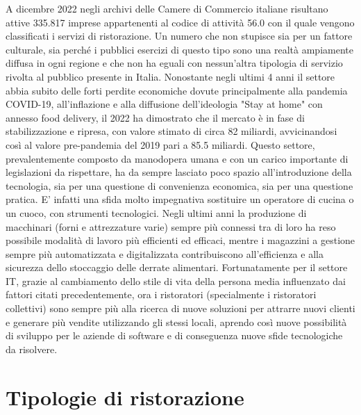 \documentclass[a4paper, titlepage, 12pt, openright, twoside]{book}
\begin{document}
A dicembre 2022 negli archivi delle Camere di Commercio italiane risultano attive 335.817 
imprese appartenenti al codice di attività 56.0 con il quale vengono classificati i servizi di ristorazione.
Un numero che non stupisce sia per un fattore culturale, sia perché i pubblici esercizi di questo tipo sono
una realtà ampiamente diffusa in ogni regione e che non ha eguali con nessun'altra tipologia di servizio rivolta al pubblico presente in Italia.
\newline
Nonostante negli ultimi 4 anni il settore abbia subito delle forti perdite economiche dovute principalmente alla pandemia COVID-19,
all'inflazione e alla diffusione dell'ideologia "Stay at home" con annesso food delivery, 
il 2022 ha dimostrato che il mercato è in fase di stabilizzazione e ripresa, con valore stimato di circa 82 miliardi,
avvicinandosi così al valore pre-pandemia del 2019 pari a 85.5 miliardi. \cite{rristorazione}
\newline
Questo settore, prevalentemente composto da manodopera umana e con un carico importante di legislazioni da rispettare, ha da sempre lasciato poco spazio all’introduzione della tecnologia, sia per una questione di convenienza economica, sia per una questione pratica. E’ infatti una sfida molto impegnativa sostituire un operatore di cucina o un cuoco, con strumenti tecnologici. Negli ultimi anni la produzione di macchinari (forni e attrezzature varie) sempre più connessi tra di loro ha reso possibile modalità di lavoro più efficienti ed efficaci, mentre i magazzini a gestione sempre più automatizzata e digitalizzata contribuiscono all'efficienza e alla sicurezza dello stoccaggio delle derrate alimentari.
\newline
Fortunatamente per il settore IT, grazie al cambiamento dello stile di vita della persona media influenzato dai fattori citati precedentemente,
ora i ristoratori (specialmente i ristoratori collettivi) sono sempre più alla ricerca di nuove soluzioni per attrarre nuovi clienti
e generare più vendite utilizzando gli stessi locali, aprendo così nuove possibilità di sviluppo per le aziende di software e di conseguenza nuove sfide tecnologiche da risolvere.

\section{Tipologie di ristorazione}
\end{document}
